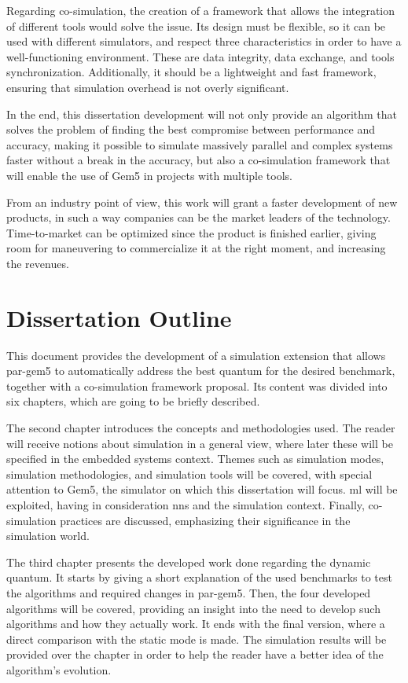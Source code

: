 Regarding co-simulation, the creation of a framework that allows the integration of different tools would solve the issue. Its design 
must be flexible, so it can be used with different simulators, and respect three characteristics in order to have a well-functioning
environment. These are data integrity, data exchange, and tools synchronization. Additionally, it should be a lightweight and fast framework, 
ensuring that simulation overhead is not overly significant.

In the end, this dissertation development will not only provide an algorithm that solves the problem of 
finding the best compromise between performance and accuracy, making it possible to simulate 
massively parallel and complex systems faster without a break in the accuracy, but also a co-simulation framework that will enable the use 
of Gem5 in projects with multiple tools.

From an industry point of view, this work will grant a faster development of new products, in such a way companies can be the market leaders 
of the technology. Time-to-market can be optimized since the product is finished earlier, giving room for maneuvering to commercialize it at the 
right moment, and increasing the revenues.
 
\section{Dissertation Outline}

This document provides the development of a simulation extension that allows par-gem5 to automatically address the best quantum for the desired 
benchmark, together with a co-simulation framework proposal. Its content was divided into six chapters, which are going to be briefly described.

The second chapter introduces the concepts and methodologies used. The reader will receive notions about simulation in a general view, where 
later these will be specified in the embedded systems context. Themes such as simulation modes, simulation methodologies, and simulation tools 
will be covered, with special attention to Gem5, the simulator on which this dissertation will focus. \gls{ml} will be exploited, having in 
consideration \glspl{nn} and the simulation context. Finally, co-simulation practices are discussed, emphasizing their significance in the 
simulation world.

The third chapter presents the developed work done regarding the dynamic quantum. It starts by giving a short explanation of the used benchmarks
to test the algorithms and required changes in par-gem5. Then, the four developed algorithms will be covered, providing an insight into the need to develop 
such algorithms and how they actually work. It ends with the final version, where a direct comparison with the static mode is made. The 
simulation results will be provided over the chapter in order to help the reader have a better idea of the algorithm's evolution.


